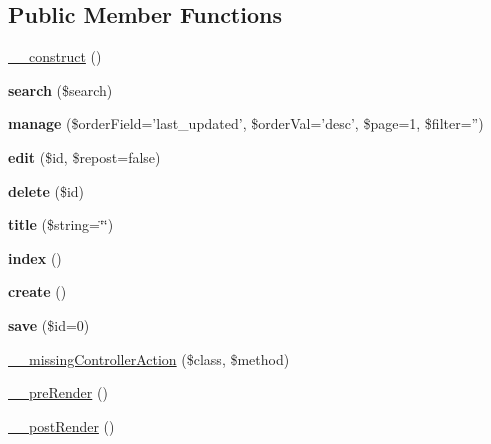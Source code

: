 \subsection*{Public Member Functions}
\begin{DoxyCompactItemize}
\item 
\hyperlink{class_settings_controller_a095c5d389db211932136b53f25f39685}{\_\-\_\-construct} ()
\item 
\hypertarget{class_settings_controller_a0d624b549023221829714196e71f38da}{
{\bfseries search} (\$search)}
\label{class_settings_controller_a0d624b549023221829714196e71f38da}

\item 
\hypertarget{class_settings_controller_ad7a8a1631b0c07e5eaac56371b48d5c8}{
{\bfseries manage} (\$orderField='last\_\-updated', \$orderVal='desc', \$page=1, \$filter='')}
\label{class_settings_controller_ad7a8a1631b0c07e5eaac56371b48d5c8}

\item 
\hypertarget{class_settings_controller_a3e2ca5065723bc35286c37f76b86fac2}{
{\bfseries edit} (\$id, \$repost=false)}
\label{class_settings_controller_a3e2ca5065723bc35286c37f76b86fac2}

\item 
\hypertarget{class_settings_controller_a2f8258add505482d7f00ea26493a5723}{
{\bfseries delete} (\$id)}
\label{class_settings_controller_a2f8258add505482d7f00ea26493a5723}

\item 
\hypertarget{class_table_controller_a09086607bdf0caa184393e8fa08a55bc}{
{\bfseries title} (\$string=\char`\"{}\char`\"{})}
\label{class_table_controller_a09086607bdf0caa184393e8fa08a55bc}

\item 
\hypertarget{class_table_controller_a149eb92716c1084a935e04a8d95f7347}{
{\bfseries index} ()}
\label{class_table_controller_a149eb92716c1084a935e04a8d95f7347}

\item 
\hypertarget{class_table_controller_a435e7d7525d4bcd0ed5e34a469f3adf6}{
{\bfseries create} ()}
\label{class_table_controller_a435e7d7525d4bcd0ed5e34a469f3adf6}

\item 
\hypertarget{class_table_controller_a1a4fb85b713fd3fae33e237428c918f3}{
{\bfseries save} (\$id=0)}
\label{class_table_controller_a1a4fb85b713fd3fae33e237428c918f3}

\item 
\hyperlink{class_controller_a728c573e418d1f979340a4669524cacd}{\_\-\_\-missingControllerAction} (\$class, \$method)
\item 
\hyperlink{class_controller_ad86994d2463ea27cab892176e6509bdb}{\_\-\_\-preRender} ()
\item 
\hyperlink{class_controller_adc3c9cc4788f7ba7d1368fdc43568b1d}{\_\-\_\-postRender} ()
\end{DoxyCompactItemize}
